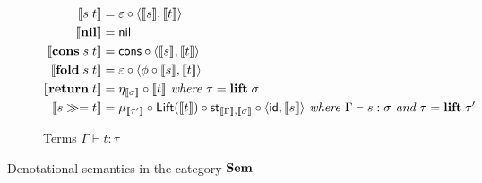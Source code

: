 \begin{figure}
\begin{subfigure}{\linewidth}
\begin{align*}
  \\
  \sem{\tmApp{s}{t}} &= \eval \comp \prodM{\sem{s}}{\sem{t}}
  \\
  \sem{\tmNil} &= \nil
  \\
  \sem{\tmCons{s}{t}} &= \cons \comp \prodM{\sem{s}}{\sem{t}}
  \\
  \sem{\tmFold{s}{t}} &= \eval \comp \prodM{\phi \comp \sem{s}}{\sem{t}}
  \\
  \sem{\tmReturn{t}} &= \eta_{\sem{\sigma}} \comp \sem{t}
  \textit{ where }\tau = \tyLift\;\sigma
  \\
  \sem{\tmBind{s}{t}} &= \mu_{\sem{\tau'}} \comp \Lift(\sem{t}) \comp \mathsf{st}_{\sem{\Gamma},\sem{\sigma}} \comp \prodM{\id}{\sem{s}}
  \textit{ where }\Gamma \vdash s: \sigma\textit{ and }\tau = \tyLift\;\tau'
  \end{align*}
  \caption{Terms $\Gamma \vdash t: \tau$}
  \label{fig:semantics:terms}
\end{subfigure}
\caption{Denotational semantics in the category $\Sem$}
\end{figure}
